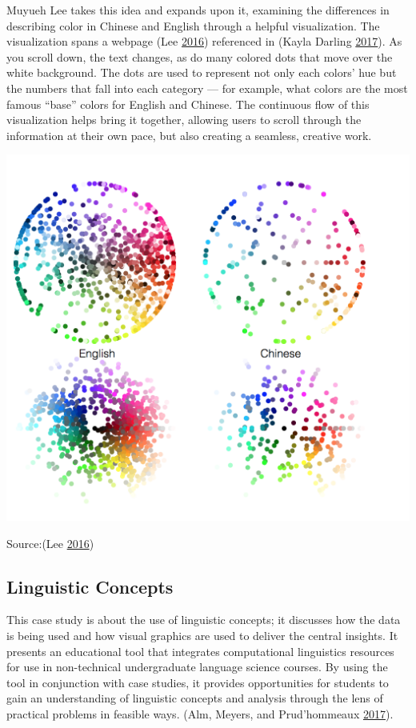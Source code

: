 \documentclass[]{book}
\begin{document}
Muyueh Lee takes this idea and expands upon it, examining the differences in describing color in Chinese and English through a helpful visualization.
The visualization spans a webpage (Lee \protect\hyperlink{ref-green_honey}{2016}) referenced in (Kayla Darling \protect\hyperlink{ref-cool_data}{2017}). As you scroll down, the text changes, as do many colored dots that move over the white background. The dots are used to represent not only each colors' hue but the numbers that fall into each category --- for example, what colors are the most famous ``base'' colors for English and Chinese. The continuous flow of this visualization helps bring it together, allowing users to scroll through the information at their own pace, but also creating a seamless, creative work.

\includegraphics{images/colorwords.png}

Source:(Lee \protect\hyperlink{ref-green_honey}{2016})

\hypertarget{linguistic-concepts}{%
\subsection{Linguistic Concepts}\label{linguistic-concepts}}

This case study is about the use of linguistic concepts; it discusses how the data is being used and how visual graphics are used to deliver the central insights. It presents an educational tool that integrates computational linguistics resources for use in non-technical undergraduate language science courses. By using the tool in conjunction with case studies, it provides opportunities for students to gain an understanding of linguistic concepts and analysis through the lens of practical problems in feasible ways. (Alm, Meyers, and Prud'hommeaux \protect\hyperlink{ref-lingui_data}{2017}).
\end{document}
